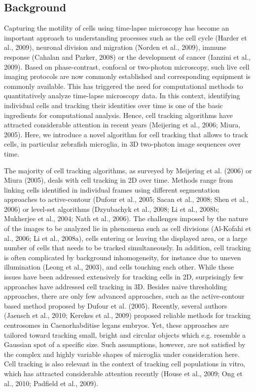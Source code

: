 \subsection{Background}
Capturing the motility of cells using time-lapse microscopy has become an important approach to understanding processes such as the cell cycle (Harder et al., 2009), neuronal division and migration (Norden et al., 2009), immune response (Cahalan and Parker, 2008) or the development of cancer (Ianzini et al., 2009). Based on phase-contrast, confocal or two-photon microscopy, such live cell imaging protocols are now commonly established and corresponding equipment is commonly available. This has triggered the need for computational methods to quantitatively analyze time-lapse microscopy data. In this context, identifying individual cells and tracking their identities over time is one of the basic ingredients for computational analysis. Hence, cell tracking algorithms have attracted considerable attention in recent years (Meijering et al., 2006; Miura, 2005). Here, we introduce a novel algorithm for cell tracking that allows to track cells, in particular zebrafish microglia, in 3D two-photon image sequences over time.

The majority of cell tracking algorithms, as surveyed by Meijering et al. (2006) or Miura (2005), deals with cell tracking in 2D over time. Methods range from linking cells identified in individual frames using different segmentation approaches to active-contour (Dufour et al., 2005; Sacan et al., 2008; Shen et al., 2006) or level-set algorithms (Dzyubachyk et al., 2008; Li et al., 2008b; Mukherjee et al., 2004; Nath et al., 2006). The challenges imposed by the nature of the images to be analyzed lie in phenomena such as cell divisions (Al-Kofahi et al., 2006; Li et al., 2008a), cells entering or leaving the displayed area, or a large number of cells that needs to be tracked simultaneously. In addition, cell tracking is often complicated by background inhomogeneity, for instance due to uneven illumination (Leong et al., 2003), and cells touching each other. While these issues have been addressed extensively for tracking cells in 2D, surprisingly few approaches have addressed cell tracking in 3D. Besides naive thresholding approaches, there are only few advanced approaches, such as the active-contour based method proposed by Dufour et al. (2005). Recently, several authors (Jaensch et al., 2010; Kerekes et al., 2009) proposed reliable methods for tracking centrosomes in Caenorhabditise legans embryos. Yet, these approaches are tailored toward tracking small, bright and circular objects which e.g. resemble a Gaussian spot of a specific size. Such assumptions, however, are not satisfied by the complex and highly variable shapes of microglia under consideration here. Cell tracking is also relevant in the context of tracking cell populations in vitro, which has attracted considerable attention recently (House et al., 2009; Ong et al., 2010; Padfield et al., 2009).
